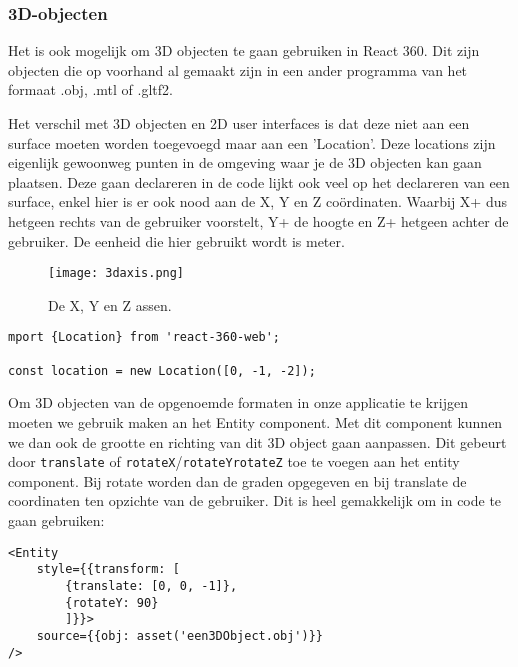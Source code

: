 \subsubsection{3D-objecten}
\label{ssubsec:3d-objecten}
Het is ook mogelijk om 3D objecten te gaan gebruiken in React 360. Dit zijn objecten die op voorhand al gemaakt zijn in een ander programma van het formaat .obj, .mtl of .gltf2.

Het verschil met 3D objecten en 2D user interfaces is dat deze niet aan een surface moeten worden toegevoegd maar aan een 'Location'. Deze locations zijn eigenlijk gewoonweg punten in de omgeving waar je de 3D objecten kan gaan plaatsen. Deze gaan declareren in de code lijkt ook  veel op het declareren van een surface, enkel hier is er ook nood aan de X, Y en Z coördinaten. Waarbij X+ dus hetgeen rechts van de gebruiker voorstelt, Y+ de hoogte en Z+ hetgeen achter de gebruiker. De eenheid die hier gebruikt wordt is meter.

\begin{figure}[h]
	\centering
	\texttt{[image: 3daxis.png]}
	\caption{De X, Y en Z assen.}
	\label{fig:xyz-axis}
\end{figure}

\begin{lstlisting}[frame=single, caption=Voorbeeld van een surface]
mport {Location} from 'react-360-web';

const location = new Location([0, -1, -2]);
\end{lstlisting}

Om 3D objecten van de opgenoemde formaten in onze applicatie te krijgen moeten we gebruik maken an het Entity component. Met dit component kunnen we dan ook de grootte en richting van dit 3D object gaan aanpassen. Dit gebeurt door \lstinline[basicstyle=\ttfamily\color{red}]|translate| of \lstinline[basicstyle=\ttfamily\color{red}]|rotateX|/\lstinline[basicstyle=\ttfamily\color{red}]|rotateY|\lstinline[basicstyle=\ttfamily\color{red}]|rotateZ| toe te voegen aan het entity component. Bij rotate worden dan de graden opgegeven en bij translate de coordinaten ten opzichte van de gebruiker. Dit is heel gemakkelijk om in code te gaan gebruiken:

\begin{lstlisting}[frame=single, caption=Voorbeeld van een Entity component]
<Entity 
	style={{transform: [
		{translate: [0, 0, -1]},
		{rotateY: 90}
		]}}>
	source={{obj: asset('een3DObject.obj')}}
/>
\end{lstlisting}


